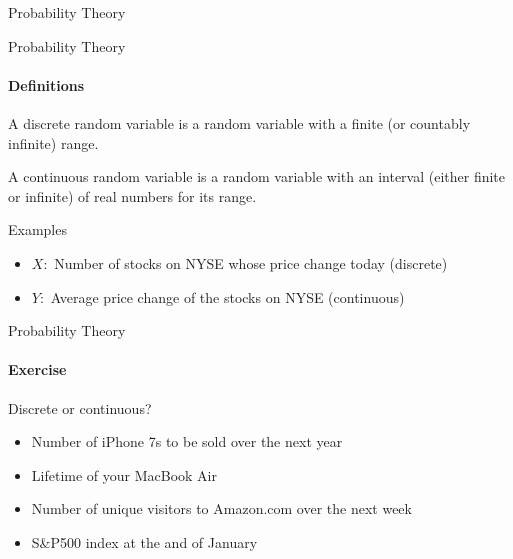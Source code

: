 \documentclass{beamer}\usepackage[]{graphicx}\usepackage[]{color}
\begin{document}
\begin{darkframes}
\begin{frame}[label=lists]{Probability Theory}
				
    \end{frame}
    
       
    

    \begin{frame}[label=lists]{Probability Theory}
		\framesubtitle{Definitions}    
      	
      	\begin{definition}
       		A \alert{discrete random variable} is a random variable with a finite (or countably infinite) range.  \pause
       		
       		A \alert{continuous random variable} is a random variable with an interval (either finite or infinite) of real numbers for its range.
      	\end{definition} \pause
    
    
    	\begin{exampleblock}{Examples}
      		\begin{itemize}

				\item $X:$ Number of stocks on NYSE whose price change today (discrete) \pause
				\item $Y:$ Average price change of the stocks on NYSE (continuous)

			\end{itemize}
        \end{exampleblock}
  
	\end{frame}  
	
	
	
   \begin{frame}[label=lists]{Probability Theory}
		\framesubtitle{Exercise}    
      	Discrete or continuous?  \pause
      		\begin{itemize}
				
				\item Number of iPhone 7s to be sold over the next year  \pause
				\item Lifetime of your MacBook Air  \pause
				\item Number of unique visitors to Amazon.com over the next week  \pause
      			\item S\&P500 index at the and of January  %
    
			\end{itemize}
	\end{frame} 
	

\end{darkframes}
\end{document}
